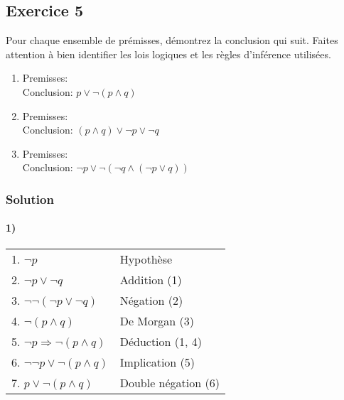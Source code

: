 \subsection*{Exercice 5}
Pour chaque ensemble de prémisses, démontrez la conclusion qui suit. Faites attention à bien identifier les
lois logiques et les règles d'inférence utilisées.
\begin{enumerate}
\item Premisses: \\
      Conclusion: $p \vee \neg (p \wedge q)$
\item Premisses: \\
      Conclusion: $(p \wedge q) \vee \neg p \vee \neg q$
\item Premisses: \\
      Conclusion: $\neg p \vee \neg (\neg q \wedge (\neg p \vee q))$
\end{enumerate}

    \subsubsection{Solution}
    
    \paragraph{1)}
    \begin{center}
    \begin{tabular}{|l|l|}
    \hline
    \hspace{0.5cm} 1. $\neg p$ & Hypothèse \\
    \hspace{0.5cm} 2. $\neg p \lor \neg q$ & Addition (1) \\
    \hspace{0.5cm} 3. $\neg \neg(\neg p \lor \neg q)$ & Négation (2) \\
    \hspace{0.5cm} 4. $\neg(p \land q)$ & De Morgan (3)\\ 
    5. $\neg p \Rightarrow \neg(p \land q)$ & Déduction (1, 4) \\
    6. $\neg \neg p \lor \neg(p \land q)$ & Implication (5)\\
    7. $p \lor \neg(p \land q)$ & Double négation (6)\\
    \hline
    \end{tabular}
    \end{center}


